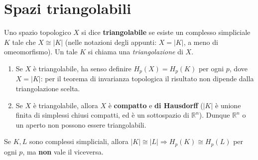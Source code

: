 \section{Spazi triangolabili}

\begin{definicion}
Uno spazio topologico $X$ si dice \textbf{triangolabile} se esiste un complesso simpliciale $K$ tale che $X \cong |K|$ (nelle notazioni degli appunti: $X = |K|$, a meno di omeomorfismo). Un tale $K$ si chiama una \emph{triangolazione} di $X$.
\end{definicion}

\begin{observacion}
\begin{enumerate}
    \item Se $X$ \`e triangolabile, ha senso definire $H_p(X) = H_p(K)$ per ogni $p$, dove $X = |K|$: per il teorema di invarianza topologica il risultato non dipende dalla triangolazione scelta.
    \item Se $X$ \`e triangolabile, allora $X$ \`e \textbf{compatto} e \textbf{di Hausdorff} ($|K|$ \`e unione finita di simplessi chiusi compatti, ed \`e un sottospazio di $\mathbb{R}^n$). Dunque $\mathbb{R}^n$ o un aperto non possono essere triangolabili.
\end{enumerate}
\end{observacion}

\begin{observacion}
Se $K, L$ sono complessi simpliciali, allora $|K| \cong |L| \Rightarrow H_p(K) \cong H_p(L)$ per ogni $p$, ma \textbf{non} vale il viceversa.
\end{observacion}

